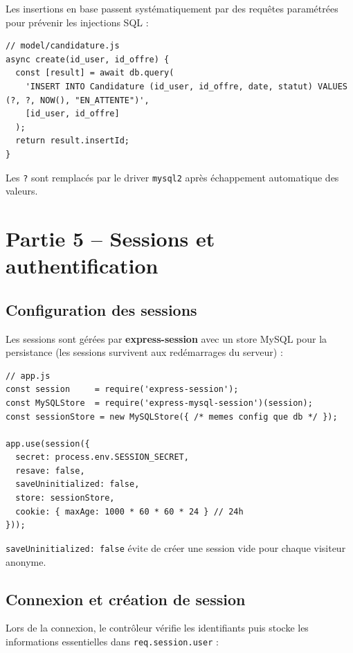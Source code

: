 \documentclass[12pt,a4paper]{article}
\begin{document}
Les insertions en base passent systématiquement par des requêtes paramétrées pour prévenir les injections SQL :

\begin{lstlisting}
// model/candidature.js
async create(id_user, id_offre) {
  const [result] = await db.query(
    'INSERT INTO Candidature (id_user, id_offre, date, statut) VALUES (?, ?, NOW(), "EN_ATTENTE")',
    [id_user, id_offre]
  );
  return result.insertId;
}
\end{lstlisting}

Les \texttt{?} sont remplacés par le driver \texttt{mysql2} après échappement automatique des valeurs.

\section{Partie 5 -- Sessions et authentification}

\subsection{Configuration des sessions}

Les sessions sont gérées par \textbf{express-session} avec un store MySQL pour la persistance (les sessions survivent aux redémarrages du serveur) :

\begin{lstlisting}
// app.js
const session     = require('express-session');
const MySQLStore  = require('express-mysql-session')(session);
const sessionStore = new MySQLStore({ /* memes config que db */ });

app.use(session({
  secret: process.env.SESSION_SECRET,
  resave: false,
  saveUninitialized: false,
  store: sessionStore,
  cookie: { maxAge: 1000 * 60 * 60 * 24 } // 24h
}));
\end{lstlisting}

\texttt{saveUninitialized: false} évite de créer une session vide pour chaque visiteur anonyme.

\subsection{Connexion et création de session}

Lors de la connexion, le contrôleur vérifie les identifiants puis stocke les informations essentielles dans \texttt{req.session.user} :
\end{document}
